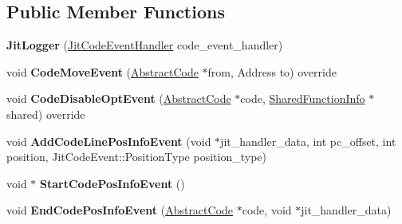 \subsection*{Public Member Functions}
\begin{DoxyCompactItemize}
\item 
{\bfseries Jit\+Logger} (\hyperlink{namespacev8_a39243bc91e63d64d111452fdb98c4733}{Jit\+Code\+Event\+Handler} code\+\_\+event\+\_\+handler)\hypertarget{classv8_1_1internal_1_1_jit_logger_ae534faff27b42623919bbe97d4625781}{}\label{classv8_1_1internal_1_1_jit_logger_ae534faff27b42623919bbe97d4625781}

\item 
void {\bfseries Code\+Move\+Event} (\hyperlink{classv8_1_1internal_1_1_abstract_code}{Abstract\+Code} $\ast$from, Address to) override\hypertarget{classv8_1_1internal_1_1_jit_logger_ab765db18b1676b8ef189ba8608dbc482}{}\label{classv8_1_1internal_1_1_jit_logger_ab765db18b1676b8ef189ba8608dbc482}

\item 
void {\bfseries Code\+Disable\+Opt\+Event} (\hyperlink{classv8_1_1internal_1_1_abstract_code}{Abstract\+Code} $\ast$code, \hyperlink{classv8_1_1internal_1_1_shared_function_info}{Shared\+Function\+Info} $\ast$shared) override\hypertarget{classv8_1_1internal_1_1_jit_logger_a70e58681e173fd9e4805db130eff432e}{}\label{classv8_1_1internal_1_1_jit_logger_a70e58681e173fd9e4805db130eff432e}

\item 
void {\bfseries Add\+Code\+Line\+Pos\+Info\+Event} (void $\ast$jit\+\_\+handler\+\_\+data, int pc\+\_\+offset, int position, Jit\+Code\+Event\+::\+Position\+Type position\+\_\+type)\hypertarget{classv8_1_1internal_1_1_jit_logger_af2076ae625c31e5165653dde71a30e49}{}\label{classv8_1_1internal_1_1_jit_logger_af2076ae625c31e5165653dde71a30e49}

\item 
void $\ast$ {\bfseries Start\+Code\+Pos\+Info\+Event} ()\hypertarget{classv8_1_1internal_1_1_jit_logger_ae521e7d5d7de523dd5fd5a57b1f39907}{}\label{classv8_1_1internal_1_1_jit_logger_ae521e7d5d7de523dd5fd5a57b1f39907}

\item 
void {\bfseries End\+Code\+Pos\+Info\+Event} (\hyperlink{classv8_1_1internal_1_1_abstract_code}{Abstract\+Code} $\ast$code, void $\ast$jit\+\_\+handler\+\_\+data)\hypertarget{classv8_1_1internal_1_1_jit_logger_ab2606142b141c5d3a72609f789d5ccc1}{}\label{classv8_1_1internal_1_1_jit_logger_ab2606142b141c5d3a72609f789d5ccc1}

\end{DoxyCompactItemize}
